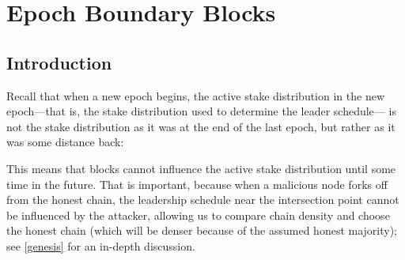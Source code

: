\chapter{Epoch Boundary Blocks}
\label{ebbs}

\section{Introduction}

Recall that when a new epoch begins, the active stake distribution in the new
epoch---that is, the stake distribution used to determine the leader schedule---
is not the stake distribution as it was at the end of the last epoch, but
rather as it was some distance back:
%
\begin{center}
\end{center}
%
This means that blocks cannot influence the active stake distribution until
some time in the future. That is important, because when a malicious node
forks off from the honest chain, the leadership schedule near the intersection
point cannot be influenced by the attacker, allowing us to compare chain
density and choose the honest chain (which will be denser because of the
assumed honest majority); see \cref{genesis} for an in-depth discussion.

